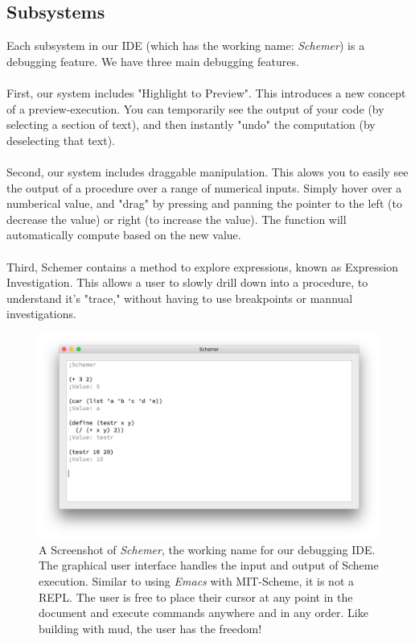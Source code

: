 \documentclass[10pt,journal,compsoc]{IEEEtran}
\begin{document}
        \subsection{Subsystems}
        Each subsystem in our IDE (which has the working name: \emph{Schemer}) is a debugging feature. We have three main debugging features.\\
        \\
        First, our system includes "Highlight to Preview". This introduces a new concept of a preview-execution. You can temporarily see the output of your code (by selecting a section of text), and then instantly "undo" the computation (by deselecting that text).\\
        \\
        Second, our system includes draggable manipulation. This alows you to easily see the output of a procedure over a range of numerical inputs. Simply hover over a numberical value, and "drag" by pressing and panning the pointer to the left (to decrease the value) or right (to increase the value). The function will automatically compute based on the new value.\\
        \\
        Third, Schemer contains a method to explore expressions, known as Expression Investigation. This allows a user to slowly drill down into a procedure, to understand it's "trace," without having to use breakpoints or mannual investigations. 
        
        \begin{figure}
            \includegraphics[width=\linewidth]{preview-1.png}
            \caption{A Screenshot of \emph{Schemer}, the working name for our debugging IDE. The graphical user interface handles the input and output of Scheme execution. Similar to using \emph{Emacs} with MIT-Scheme, it is not a REPL. The user is free to place their cursor at any point in the document and execute commands anywhere and in any order. Like building with mud, the user has the freedom!}
            \label{fig:overview}
        \end{figure}
\end{document}
